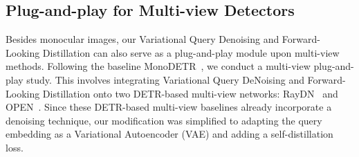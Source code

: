 \subsection{Plug-and-play for Multi-view Detectors}
Besides monocular images, our Variational Query Denoising and Forward-Looking Distillation can also serve as a plug-and-play module upon multi-view methods. Following the baseline MonoDETR~\cite{MonoDETR}, we conduct a multi-view plug-and-play study. This involves integrating Variational Query DeNoising and Forward-Looking Distillation onto two DETR-based multi-view networks: RayDN~\cite{RayDN} and OPEN~\cite{OPEN}. Since these DETR-based multi-view baselines already incorporate a denoising technique, our modification was simplified to adapting the query embedding as a Variational Autoencoder (VAE) and adding a self-distillation loss.